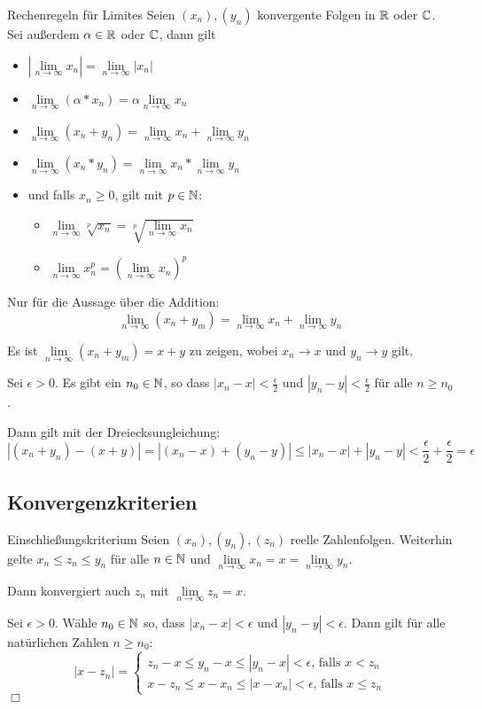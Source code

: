 \begin{satz}{Rechenregeln für Limites}
	Seien $(x_n), (y_n)$ konvergente Folgen in $\mathbb{R}$ oder $\mathbb{C}$. Sei außerdem $\alpha\in\mathbb{R}$ oder $\mathbb{C}$, dann gilt

	\begin{itemize}
		\item $\left|\lim\limits_{n\to\infty}x_n\right|=\lim\limits_{n\to\infty}|x_n|$
		\item $\lim\limits_{n\to\infty}(\alpha * x_n) = \alpha \lim\limits_{n\to\infty}x_n$
		\item $\lim\limits_{n\to\infty}(x_n+y_n)=\lim\limits_{n\to\infty}x_n+\lim\limits_{n\to\infty}y_n$
		\item $\lim\limits_{n\to\infty}(x_n*y_n)=\lim\limits_{n\to\infty}x_n*\lim\limits_{n\to\infty}y_n$
		\item und falls $x_n\geq 0$, gilt mit $p\in\mathbb{N}$:
		\begin{itemize}
			\item $ \lim\limits_{n\to\infty}\sqrt[p]{x_n}=\sqrt[p]{\lim\limits_{n\to\infty}x_n}$
			\item $\lim\limits_{n\to\infty}x_n^p = \left(\lim\limits_{n\to\infty}x_n\right)^p$
		\end{itemize}
	\end{itemize}
\end{satz}
\beweis
Nur für die Aussage über die Addition:
$$\lim\limits_{n\to\infty}(x_n+y_m)=\lim\limits_{n\to\infty}x_n+\lim\limits_{n\to\infty}y_n$$

Es ist $\lim\limits_{n\to\infty}(x_n+y_m) = x+y$ zu zeigen, wobei $x_n\to x$ und $y_n\to y$ gilt.

Sei $\epsilon>0$. Es gibt ein $n_0\in\mathbb{N}$, so dass $|x_n-x|<\frac\epsilon2$ und $|y_n-y|<\frac\epsilon2$ für alle $n\geq n_0$.

Dann gilt mit der Dreiecksungleichung: $$\left|(x_n+y_n)-(x+y)\right|=\left|(x_n-x)+(y_n-y)\right|\leq |x_n-x|+|y_n-y|<\frac\epsilon2+\frac\epsilon2=\epsilon$$


\subsection{Konvergenzkriterien}
\begin{satz}{Einschließungskriterium}
	Seien $(x_n), (y_n), (z_n)$ reelle Zahlenfolgen. Weiterhin gelte $x_n\leq z_n\leq y_n$ für alle $n\in\mathbb{N}$ und $\lim\limits_{n\to\infty} x_n=x=\lim\limits_{n\to\infty} y_n$.

	Dann konvergiert auch $z_n$ mit $\lim\limits_{n\to\infty} z_n = x$.
\end{satz}
\beweis
Sei $\epsilon>0$. Wähle $n_0\in\mathbb{N}$ so, dass $|x_n-x|<\epsilon$ und $|y_n-y|<\epsilon$. Dann gilt für alle natürlichen Zahlen $n\geq n_0$:
\begin{equation*}
	|x-z_n|=\begin{cases}
		z_n-x\leq y_n-x \leq |y_n-x| <\epsilon \text{, falls $x<z_n$}\\
		x-z_n\leq x-x_n \leq |x-x_n| <\epsilon \text{, falls $x\leq z_n$}
	\end{cases}
\end{equation*}
\hfill $\Box$

